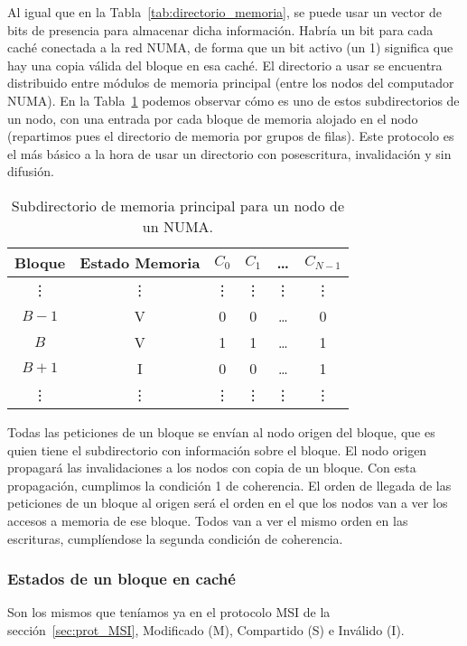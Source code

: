 Al igual que en la Tabla~\ref{tab:directorio_memoria}, se puede usar un vector de bits de presencia para almacenar dicha información. Habría un bit para cada caché conectada a la red NUMA, de forma que un bit activo (un 1) significa que hay una copia válida del bloque en esa caché. El directorio a usar se encuentra distribuido entre módulos de memoria principal (entre los nodos del computador NUMA). En la Tabla~\ref{tab:subdirectorio_memoria} podemos observar cómo es uno de estos subdirectorios de un nodo, con una entrada por cada bloque de memoria alojado en el nodo (repartimos pues el directorio de memoria por grupos de filas). Este protocolo es el más básico a la hora de usar un directorio con posescritura, invalidación y sin difusión.

\begin{table}
\centering
\begin{tabular}{c c c c c c}
    \toprule
    Bloque & Estado Memoria & $C_0$ & $C_1$ & \ldots & $C_{N-1}$ \\
    \bottomrule
    \vdots & \vdots & \vdots & \vdots & \vdots & \vdots \\
    $B-1$ & V & 0 & 0 & \ldots & 0 \\
    $B$ & V & 1 & 1 & \ldots & 1 \\
    $B+1$ & I & 0 & 0 & \ldots & 1 \\
    \vdots & \vdots & \vdots & \vdots & \vdots & \vdots \\
    \bottomrule
\end{tabular}
\caption{Subdirectorio de memoria principal para un nodo de un NUMA.}
\label{tab:subdirectorio_memoria}
\end{table}

Todas las peticiones de un bloque se envían al nodo origen del bloque, que es quien tiene el subdirectorio con información sobre el bloque. El nodo origen propagará las invalidaciones a los nodos con copia de un bloque. Con esta propagación, cumplimos la condición 1 de coherencia. El orden de llegada de las peticiones de un bloque al origen será el orden en el que los nodos van a ver los accesos a memoria de ese bloque. Todos van a ver el mismo orden en las escrituras, cumplíendose la segunda condición de coherencia.

\subsubsection{Estados de un bloque en caché}
Son los mismos que teníamos ya en el protocolo MSI de la sección~\ref{sec:prot_MSI}, Modificado (M), Compartido (S) e Inválido (I).

